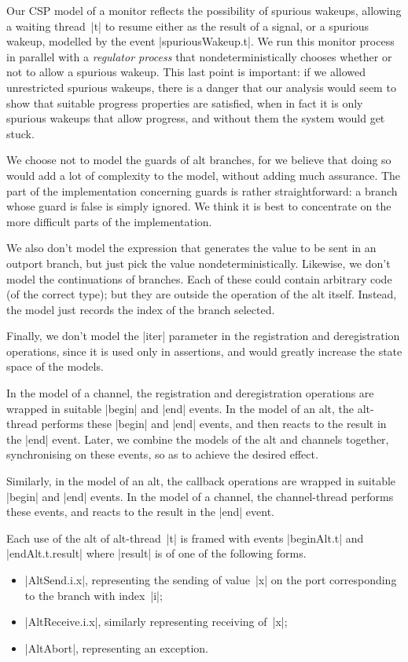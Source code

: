 Our CSP model of a monitor reflects the possibility of spurious wakeups,
allowing a waiting thread~|t| to resume either as the result of a signal, or a
spurious wakeup, modelled by the event |spuriousWakeup.t|.  We run this
monitor process in parallel with a \emph{regulator process} that
nondeterministically chooses whether or not to allow a spurious wakeup.  This
last point is important: if we allowed unrestricted spurious wakeups, there is
a danger that our analysis would seem to show that suitable progress
properties are satisfied, when in fact it is only spurious wakeups that allow
progress, and without them the system would get stuck.

We choose not to model the guards of alt branches, for we believe that doing
so would add a lot of complexity to the model, without adding much assurance.
The part of the implementation concerning guards is rather straightforward: a
branch whose guard is false is simply ignored.  We think it is best to
concentrate on the more difficult parts of the implementation.

We also don't model the expression that generates the value to be sent in an
outport branch, but just pick the value nondeterministically.  Likewise, we
don't model the continuations of branches.  Each of these could contain
arbitrary code (of the correct type); but they are outside the operation of
the alt itself.  Instead, the model just records the index of the branch
selected. 
 
Finally, we don't model the |iter| parameter in the registration and
deregistration operations, since it is used only in assertions, and would
greatly increase the state space of the models. 

In the model of a channel, the registration and deregistration operations are
wrapped in suitable |begin| and |end| events.  In the model of an alt, the
alt-thread performs these |begin| and |end| events, and then reacts to the
result in the |end| event.  Later, we combine the models of the alt and
channels together, synchronising on these events, so as to achieve the desired
effect.

Similarly, in the model of an alt, the callback operations are wrapped in
suitable |begin| and |end| events.  In the model of a channel, the
channel-thread performs these events, and reacts to the result in the |end|
event.  

Each use of the alt of alt-thread~|t| is framed with events |beginAlt.t| and
|endAlt.t.result| where |result| is of one of the following forms.
%
\begin{itemize}
\item |AltSend.i.x|, representing the sending of value~|x| on the port
  corresponding to the branch with index~|i|;

\item |AltReceive.i.x|, similarly representing receiving of~|x|;

\item |AltAbort|, representing an  exception.
\end{itemize}
